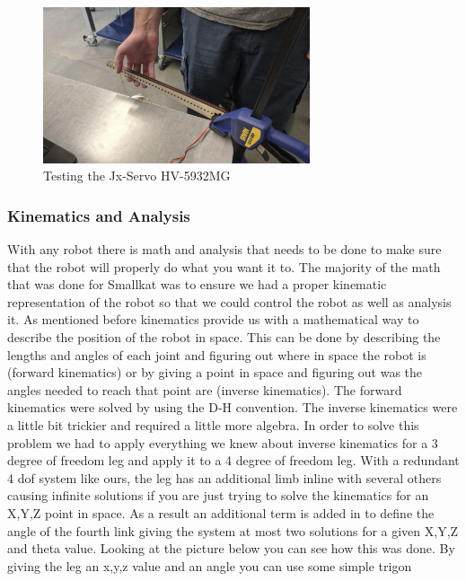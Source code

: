                 \begin{figure}[H]
                    \centering
                    \includegraphics[width=0.7\textwidth]{figures/TestingMotors.png}
                    \caption{Testing the Jx-Servo HV-5932MG}
                    \label{fig:MotorTesting}
                \end{figure}        

        \subsubsection{Kinematics and Analysis}
        
            With any robot there is math and analysis that needs to be done to make sure that the robot will properly do what you want it to. The majority of the math that was done for Smallkat was to ensure we had a proper kinematic representation of the robot so that we could control the robot as well as analysis it. As mentioned before kinematics provide us with a mathematical way to describe the position of the robot in space. This can be done by describing the lengths and angles of each joint and figuring out where in space the robot is (forward kinematics) or by giving a point in space and figuring out was the angles needed to reach that point are (inverse kinematics). The forward kinematics were solved by using the D-H convention. The inverse kinematics were a little bit trickier and required a little more algebra. In order to solve this problem we had to apply everything we knew about inverse kinematics for a 3 degree of freedom leg and apply it to a 4 degree of freedom leg. With a redundant 4 dof system like ours, the leg has an additional limb inline with several others causing infinite solutions if you are just trying to solve the kinematics for an X,Y,Z point in space. As a result an additional term is added in to define the angle of the fourth link giving the system at most two solutions for a given X,Y,Z and theta value. Looking at the picture below you can see how this was done. By giving the leg an x,y,z value and an angle you can use some simple trigon
        
